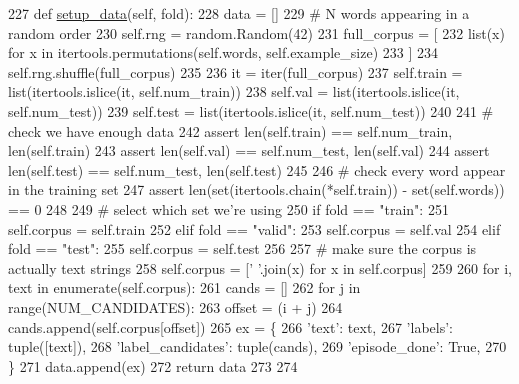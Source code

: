 \begin{DoxyCode}
227     \textcolor{keyword}{def }\hyperlink{namespaceparlai_1_1tasks_1_1multinli_1_1agents_a4fa2cb0ba1ed745336ad8bceed36b841}{setup\_data}(self, fold):
228         data = []
229         \textcolor{comment}{# N words appearing in a random order}
230         self.rng = random.Random(42)
231         full\_corpus = [
232             list(x) \textcolor{keywordflow}{for} x \textcolor{keywordflow}{in} itertools.permutations(self.words, self.example\_size)
233         ]
234         self.rng.shuffle(full\_corpus)
235 
236         it = iter(full\_corpus)
237         self.train = list(itertools.islice(it, self.num\_train))
238         self.val = list(itertools.islice(it, self.num\_test))
239         self.test = list(itertools.islice(it, self.num\_test))
240 
241         \textcolor{comment}{# check we have enough data}
242         \textcolor{keyword}{assert} len(self.train) == self.num\_train, len(self.train)
243         \textcolor{keyword}{assert} len(self.val) == self.num\_test, len(self.val)
244         \textcolor{keyword}{assert} len(self.test) == self.num\_test, len(self.test)
245 
246         \textcolor{comment}{# check every word appear in the training set}
247         \textcolor{keyword}{assert} len(set(itertools.chain(*self.train)) - set(self.words)) == 0
248 
249         \textcolor{comment}{# select which set we're using}
250         \textcolor{keywordflow}{if} fold == \textcolor{stringliteral}{"train"}:
251             self.corpus = self.train
252         \textcolor{keywordflow}{elif} fold == \textcolor{stringliteral}{"valid"}:
253             self.corpus = self.val
254         \textcolor{keywordflow}{elif} fold == \textcolor{stringliteral}{"test"}:
255             self.corpus = self.test
256 
257         \textcolor{comment}{# make sure the corpus is actually text strings}
258         self.corpus = [\textcolor{stringliteral}{' '}.join(x) \textcolor{keywordflow}{for} x \textcolor{keywordflow}{in} self.corpus]
259 
260         \textcolor{keywordflow}{for} i, text \textcolor{keywordflow}{in} enumerate(self.corpus):
261             cands = []
262             \textcolor{keywordflow}{for} j \textcolor{keywordflow}{in} range(NUM\_CANDIDATES):
263                 offset = (i + j) %
264                 cands.append(self.corpus[offset])
265             ex = \{
266                 \textcolor{stringliteral}{'text'}: text,
267                 \textcolor{stringliteral}{'labels'}: tuple([text]),
268                 \textcolor{stringliteral}{'label\_candidates'}: tuple(cands),
269                 \textcolor{stringliteral}{'episode\_done'}: \textcolor{keyword}{True},
270             \}
271             data.append(ex)
272         \textcolor{keywordflow}{return} data
273 
274 
\end{DoxyCode}


